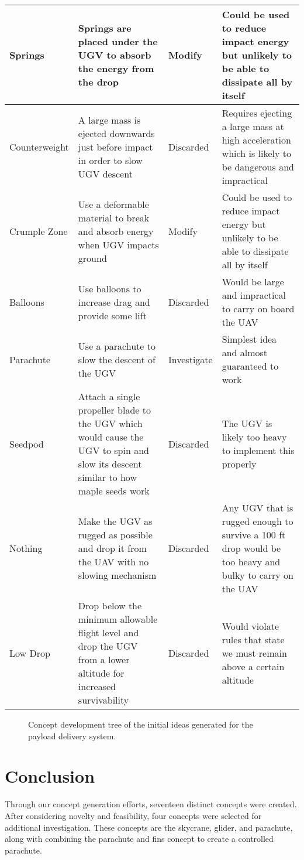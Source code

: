 \documentclass[]{auvsi_doc}
\begin{document}
\begin{center}
\begin{longtable}[H]{|p{}|p{}|p{}|p{}|}
\hline
Springs & Springs are placed under the UGV to absorb the energy from the drop & Modify & Could be used to reduce impact energy but unlikely to be able to dissipate all by itself \\
\hline
Counterweight & A large mass is ejected downwards just before impact in order to slow UGV descent & Discarded & Requires ejecting a large mass at high acceleration which is likely to be dangerous and impractical\\
\hline
Crumple Zone & Use a deformable material to break and absorb energy when UGV impacts ground & Modify & Could be used to reduce impact energy but unlikely to be able to dissipate all by itself\\
\hline
Balloons & Use balloons to increase drag and provide some lift & Discarded & Would be large and impractical to carry on board the UAV \\
\hline
Parachute & Use a parachute to slow the descent of the UGV & Investigate & Simplest idea and almost guaranteed to work \\
\hline
Seedpod & Attach a single propeller blade to the UGV which would cause the UGV to spin and slow its descent similar to how maple seeds work & Discarded & The UGV is likely too heavy to implement this properly\\
\hline
Nothing & Make the UGV as rugged as possible and drop it from the UAV with no slowing mechanism & Discarded & Any UGV that is rugged enough to survive a 100 ft drop would be too heavy and bulky to carry on the UAV \\
\hline
Low Drop & Drop below the minimum allowable flight level and drop the UGV from a lower altitude for increased survivability & Discarded & Would violate rules that state we must remain above a certain altitude\\
\hline
\end{longtable}
\end{center}


\begin{figure}
\centering
{}
\caption{Concept development tree of the initial ideas generated for the payload delivery system.}
\label{fig:ConceptTree}
\end{figure}

\section{Conclusion}
Through our concept generation efforts, seventeen distinct concepts were created. After considering novelty and feasibility, four concepts were selected for additional investigation. These concepts are the skycrane, glider, and parachute, along with combining the parachute and fins concept to create a controlled parachute.
\end{document}
